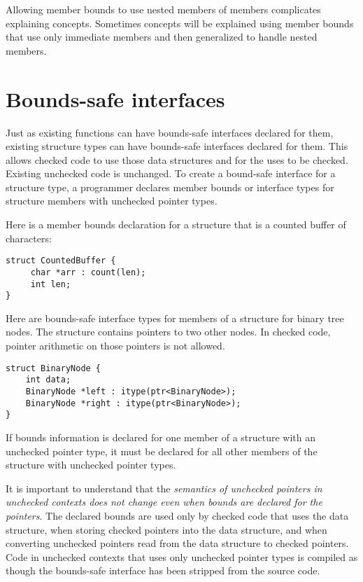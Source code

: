 Allowing member bounds to use nested members of members complicates
explaining concepts. Sometimes concepts will be explained using member
bounds that use only immediate members and then generalized to handle
nested members.

\section{Bounds-safe interfaces}
\label{section:structure-bounds-safe-interfaces}

Just as existing functions can have bounds-safe interfaces declared for
them, existing structure types can have bounds-safe interfaces declared
for them. This allows checked code to use those data structures and for
the uses to be checked. Existing unchecked code is unchanged.
To create a bound-safe interface for a structure type, a programmer
declares member bounds or interface types for structure members with
unchecked pointer types.

Here is a member bounds declaration for a structure that is a counted buffer
of characters:

\begin{lstlisting}
struct CountedBuffer {
     char *arr : count(len);
     int len;
}
\end{lstlisting}

Here are bounds-safe interface types for members of a structure for binary
tree nodes. The structure contains pointers to two other nodes.  In
checked code, pointer arithmetic on those pointers is not allowed.

\begin{lstlisting}
struct BinaryNode {
    int data;
    BinaryNode *left : itype(ptr<BinaryNode>);
    BinaryNode *right : itype(ptr<BinaryNode>);
}
\end{lstlisting}

If bounds information is declared for one member of a structure with an
unchecked pointer type, it must be declared for all other members of the
structure with unchecked pointer types.

It is important to understand that the \emph{semantics of unchecked
pointers in unchecked contexts does not change even when bounds are declared 
for the pointers}. The declared bounds are used only by checked code that uses the
data structure, when storing checked pointers into the data structure, and when converting
unchecked pointers read from the data structure to checked pointers.  Code in unchecked
contexts that uses only unchecked pointer types is compiled as though the bounds-safe
interface has been stripped from the source code.

